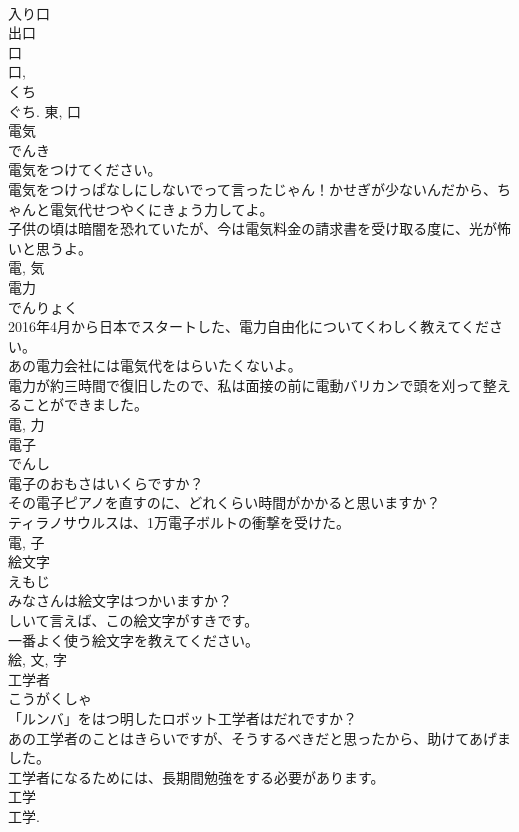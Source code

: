 \documentclass[8pt]{extreport}
\begin{document}
\begin{CJK}{UTF8}{min}
\\	入り口 
\\	出口 
\\	口 
\\	口, 
\\	くち 
\\	ぐち.	東, 口	
\\	電気	
\\	でんき	
\\	電気をつけてください。	
\\	電気をつけっぱなしにしないでって言ったじゃん！かせぎが少ないんだから、ちゃんと電気代せつやくにきょう力してよ。	
\\	子供の頃は暗闇を恐れていたが、今は電気料金の請求書を受け取る度に、光が怖いと思うよ。	
\\	電, 気	
\\	電力	
\\	でんりょく	
\\	2016年4月から日本でスタートした、電力自由化についてくわしく教えてください。	
\\	あの電力会社には電気代をはらいたくないよ。	
\\	電力が約三時間で復旧したので、私は面接の前に電動バリカンで頭を刈って整えることができました。	
\\	電, 力	
\\	電子	
\\	でんし	
\\	電子のおもさはいくらですか？	
\\	その電子ピアノを直すのに、どれくらい時間がかかると思いますか？	
\\	ティラノサウルスは、1万電子ボルトの衝撃を受けた。	
\\	電, 子	
\\	絵文字	
\\	えもじ	
\\	みなさんは絵文字はつかいますか？	
\\	しいて言えば、この絵文字がすきです。	
\\	一番よく使う絵文字を教えてください。	
\\	絵, 文, 字	
\\	工学者	
\\	こうがくしゃ	
\\	「ルンバ」をはつ明したロボット工学者はだれですか？	
\\	あの工学者のことはきらいですが、そうするべきだと思ったから、助けてあげました。	
\\	工学者になるためには、長期間勉強をする必要があります。	
\\	工学 
\\	工学. 

\end{CJK}
\end{document}
